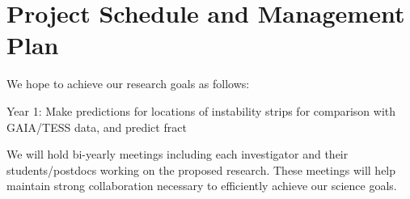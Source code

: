 \section{Project Schedule and Management Plan}

We hope to achieve our research goals as follows:

Year 1: Make predictions for locations of instability strips for comparison with GAIA/TESS data, and predict fract 

We will  hold bi-yearly meetings including each investigator and their students/postdocs working on the proposed research. These meetings will help maintain strong collaboration necessary to efficiently achieve our science goals.
